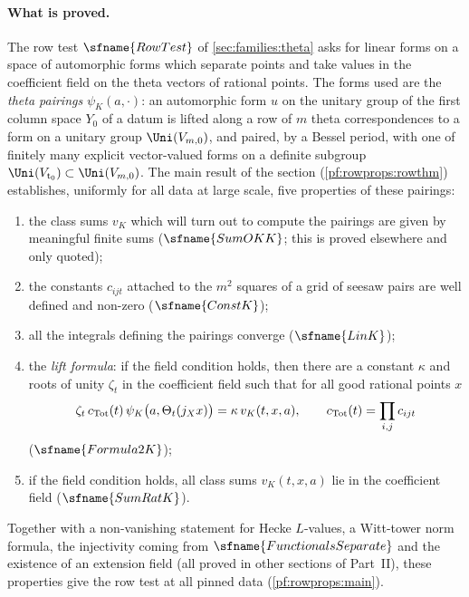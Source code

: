 \paragraph{What is proved.}
The row test $\sfname{RowTest}$ of \cref{sec:families:theta} asks for linear forms on a space of automorphic forms
which separate points and take values in the coefficient field on the theta vectors of rational points. The forms
used are the \emph{theta pairings} $\psi_K(a,\cdot)$: an automorphic form $u$ on the unitary group of the first
column space $Y_0$ of a datum is lifted along a row of $m$ theta correspondences to a form on a unitary group
$\Uni(V_{m,0})$, and paired, by a Bessel period, with one of finitely many explicit vector-valued forms on a
definite subgroup $\Uni(V_{\mathrm t_0})\subset\Uni(V_{m,0})$. The main result of the section
(\cref{pf:rowprops:rowthm}) establishes, uniformly for all data at large scale, five properties of these pairings:
\begin{enumerate}[label=(\roman*)]
\item the class sums $v_K$ which will turn out to compute the pairings are given by meaningful finite sums
($\sfname{SumOKK}$; this is proved elsewhere and only quoted);
\item the constants $c_{ijt}$ attached to the $m^2$ squares of a grid of seesaw pairs are well defined and non-zero
($\sfname{ConstK}$);
\item all the integrals defining the pairings converge ($\sfname{LinK}$);
\item the \emph{lift formula}: if the field condition holds, then there are a constant $\kappa$ and roots of unity
$\zeta_t$ in the coefficient field such that for all good rational points $x$
\begin{equation}\label{eq:pf:rowprops:formula}
\zeta_t\, c_{\mathrm{Tot}}(t)\, \psi_K\bigl(a,\Theta_t(j_X x)\bigr)=\kappa\, v_K(t,x,a),\qquad
c_{\mathrm{Tot}}(t)=\prod_{i,j}c_{ijt}
\end{equation}
($\sfname{Formula2K}$);
\item if the field condition holds, all class sums $v_K(t,x,a)$ lie in the coefficient field ($\sfname{SumRatK}$).
\end{enumerate}
Together with a non-vanishing statement for Hecke $L$-values, a Witt-tower norm formula, the injectivity coming from
$\sfname{FunctionalsSeparate}$ and the existence of an extension field (all proved in other sections of Part~II), these
properties give the row test at all pinned data (\cref{pf:rowprops:main}).

